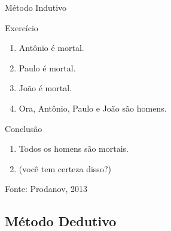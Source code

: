 \documentclass{beamer}
\begin{document}
\begin{frame}{Método Indutivo}
  \begin{block}{Exercício}
    \begin{enumerate}
    \item Antônio é mortal.
    \item Paulo é mortal.
    \item João é mortal.
    \item Ora, Antônio, Paulo e João são homens.
    \end{enumerate}
  \end{block}
  \begin{block}{Conclusão}
    \begin{enumerate}
    \item Todos os homens são mortais.
    \item (você tem certeza disso?)
    \end{enumerate}
  \end{block}

  \vfill
  Fonte: Prodanov, 2013
\end{frame}

\subsection{Método Dedutivo}
\end{document}
